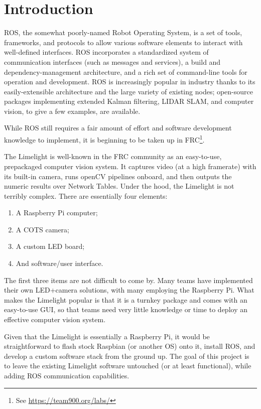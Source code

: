 \documentclass{article}
\begin{document}
\section{Introduction}
\par ROS, the somewhat poorly-named Robot Operating System, is a set of tools, frameworks, and protocols to allow various software elements to interact with well-defined interfaces. ROS incorporates a standardized system of communication interfaces (such as messages and services), a build and dependency-management architecture, and a rich set of command-line tools for operation and development. ROS is increasingly popular in industry thanks to its easily-extensible architecture and the large variety of existing nodes; open-source packages implementing extended Kalman filtering, LIDAR SLAM, and computer vision, to give a few examples, are available. 
\par While ROS still requires a fair amount of effort and software development knowledge to implement, it is beginning to be taken up in FRC\footnote{See \url{https://team900.org/labs/}}.
\par The Limelight is well-known in the FRC community as an easy-to-use, prepackaged computer vision system. It captures video (at a high framerate) with its built-in camera, runs openCV pipelines onboard, and then outputs the numeric results over Network Tables. Under the hood, the Limelight is not terribly complex. There are essentially four elements:
\begin{enumerate}
	\item A Raspberry Pi computer;
	\item A COTS camera;
	\item A custom LED board;
	\item And software/user interface. 
\end{enumerate}
The first three items are not difficult to come by. Many teams have implemented their own LED+camera solutions, with many employing the Raspberry Pi. What makes the Limelight popular is that it is a turnkey package and comes with an easy-to-use GUI, so that teams need very little knowledge or time to deploy an effective computer vision system.
\par Given that the Limelight is essentially a Raspberry Pi, it would be straightforward to flash stock Raspbian (or another OS) onto it, install ROS, and develop a custom software stack from the ground up. The goal of this project is to leave the existing Limelight software untouched (or at least functional), while adding ROS communication capabilities. 
 
\end{document}
